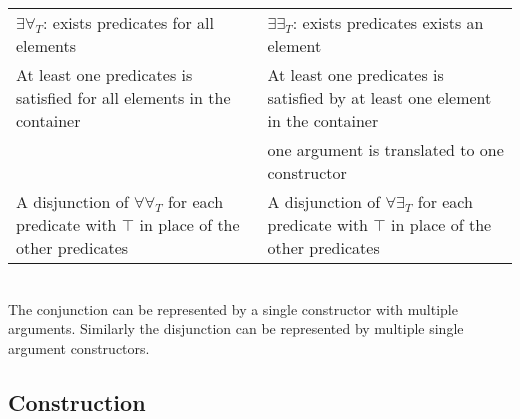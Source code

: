 \noindent\makebox[\linewidth]{\rule{\textwidth}{0.4pt}}
\begin{tabularx}{\textwidth}{ m|m }
$\exists\forall_T$: exists predicates for all elements &
$\exists\exists_T$: exists predicates exists an element \\
At least one predicates is satisfied for all elements in the container &
At least one predicates is satisfied by at least one element in the container \\
&
one argument is translated to one constructor\\
A disjunction of $\forall\forall_T$ for each predicate with $\top$ in place of the other predicates &
A disjunction of $\forall\exists_T$ for each predicate with $\top$ in place of the other predicates
\end{tabularx}
\ \\
The conjunction can be represented by a single constructor with multiple arguments.
Similarly the disjunction can be represented by multiple single argument constructors.


\subsection{Construction}